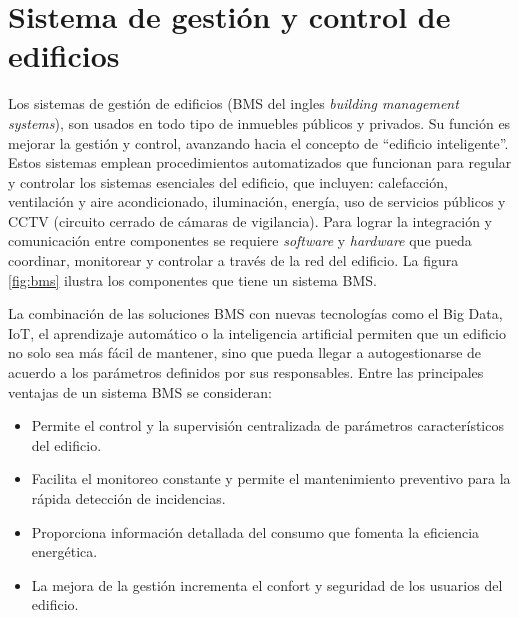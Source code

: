 





\section{Sistema de gestión y control de edificios}
Los sistemas de gestión de edificios (BMS del ingles \emph{building management systems}), son usados en todo tipo de inmuebles públicos y privados. Su función es mejorar la gestión y control, avanzando hacia el concepto de ``edificio inteligente''. Estos sistemas emplean procedimientos automatizados que funcionan para regular y controlar los sistemas esenciales del edificio, que incluyen: calefacción, ventilación y aire acondicionado, iluminación, energía, uso de servicios públicos y CCTV (circuito cerrado de cámaras de vigilancia). Para lograr la integración y comunicación entre componentes se requiere \emph{software} y \emph{hardware} que pueda coordinar, monitorear y controlar a través de la red del edificio. La figura \ref{fig:bms}  ilustra los componentes que tiene un sistema BMS.

La combinación de las soluciones BMS con nuevas tecnologías como el Big Data, IoT, el aprendizaje automático o la inteligencia artificial permiten que un edificio no solo sea más fácil de mantener, sino que pueda llegar a autogestionarse de acuerdo a los parámetros definidos por sus responsables. Entre las principales ventajas de un sistema BMS se consideran:

\vspace{0.25cm}
\begin{itemize}
\item Permite el control y la supervisión centralizada de parámetros característicos del edificio.
\item Facilita el monitoreo constante y permite el mantenimiento preventivo para la rápida detección de incidencias.
\item Proporciona información detallada del consumo que fomenta la eficiencia energética.
\item La mejora de la gestión incrementa el confort y seguridad de los usuarios del edificio.
\end{itemize} 

